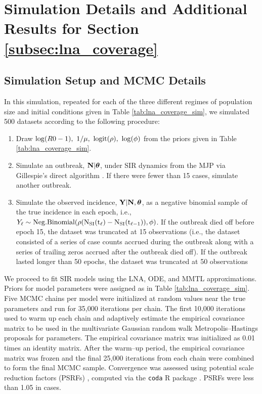 \newpage
\section{Simulation Details and Additional Results for Section \ref{subsec:lna_coverage}}
\label{sec:lna_coverage_supplement}

\subsection{Simulation Setup and MCMC Details}
\label{subsec:lna_coverage_setup_details}

In this simulation, repeated for each of the three different regimes of population size and initial conditions given in Table \ref{tab:lna_coverage_sim}, we simulated 500 datasets according to the following procedure:
\begin{enumerate}
	\item Draw $ \log(R0 - 1),\ 1/\mu,\ \logit(\rho),\ \log(\phi) $ from the priors given in Table \ref{tab:lna_coverage_sim}.
	\item Simulate an outbreak, $ \mathbf{N}|\boldsymbol{\theta} $, under SIR dynamics from the MJP via Gillespie's direct algorithm \cite{gillespie1976general}. If there were fewer than 15 cases, simulate another outbreak. 
	\item Simulate the observed incidence, $ \mathbf{Y}|\mathbf{N},\boldsymbol{\theta} $, as a negative binomial sample of the true incidence in each epoch, i.e., $ Y_\ell\sim\mathrm{Neg.Binomial(\rho(N_{SI}(t_\ell) - N_{SI}(t_{\ell-1})), \phi)} $. If the outbreak died off before epoch 15, the dataset was truncated at 15 observations (i.e., the dataset consisted of a series of case counts accrued during the outbreak along with a series of trailing zeros accrued after the outbreak died off). If the outbreak lasted longer than 50 epochs, the dataset was truncated at 50 observations
\end{enumerate}

We proceed to fit SIR models using the LNA, ODE, and MMTL approximations. Priors for model parameters were assigned as in Table \ref{tab:lna_coverage_sim}. Five MCMC chains per model were initialized at random values near the true parameters and run for 35,000 iterations per chain. The first 10,000 iterations used to warm up each chain and adaptively estimate the empirical covariance matrix to be used in the multivariate Gaussian random walk Metropolis--Hastings proposals for parameters. The empirical covariance matrix was initialized as 0.01 times an identity matrix. After the warm--up period, the empirical covariance matrix was frozen and the final 25,000 iterations from each chain were combined to form the final MCMC sample. Convergence was assessed using potential scale reduction factors (PSRFs) \cite{brooks1998general}, computed via the \texttt{coda} R package \cite{codapackage}. PSRFs were less than 1.05 in cases.

